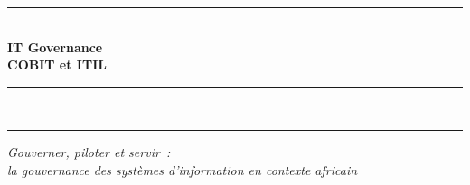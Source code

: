 \begin{titlepage}
\vspace*{0.6cm}

\begin{center}
    {\color{CouleurPrimaire}\rule{0.85\textwidth}{1.2pt}}\\[1.2ex]
    {\fontsize{26}{32}\selectfont\bfseries\color{CouleurPrimaire}
        IT Governance\\[0.4ex]
        COBIT et ITIL}\\[0.8ex]
    {\color{CouleurAccent}\rule{0.85\textwidth}{2pt}}\\[0.5ex]
    {\color{CouleurPrimaire}\rule{0.85\textwidth}{0.5pt}}
\end{center}

\vspace{0.8cm}

\begin{center}
    {\fontsize{13}{16}\selectfont\itshape\color{CouleurSecondaire}
        Gouverner, piloter et servir~:\\
        la gouvernance des systèmes d'information en contexte africain}
\end{center}

\vspace{0.5cm}

\begin{center}
\end{center}

\vspace{1.0cm}


\end{titlepage}
